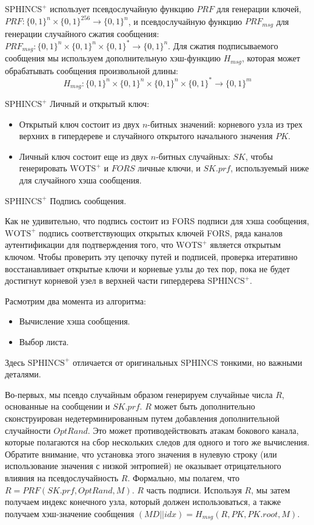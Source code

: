 \documentclass[a4paper, 14pt]{extarticle}
\begin{document}
$\text{SPHINCS}^{+}$ использует псевдослучайную функцию $PRF$ для генерации ключей, $PRF : \{0, 1\}^{n} \times \{0, 1\}^{256} \rightarrow \{0, 1\}^{n}$, и псевдослучайную функцию $PRF_{msg}$ для генерации случайного сжатия сообщения: $PRF_{msg} : \{0, 1\}^{n} \times \{0, 1\}^{n} \times \{0, 1\}^{*} \rightarrow \{0, 1\}^{n}$. Для сжатия подписываемого сообщения мы используем дополнительную хэш-функцию $H_{msg}$, которая может обрабатывать сообщения произвольной длины:
\[H_{msg} : \{0, 1\}^{n} \times \{0, 1\}^{n} \times \{0, 1\}^{n} \times \{0, 1\}^{*} \rightarrow \{0, 1\}^{m}\]

$\text{SPHINCS}^{+}$ Личный и открытый ключ:

\begin{itemize}
    \item Открытый ключ состоит из двух $n$-битных значений: корневого узла из трех верхних в гипердереве и случайного открытого начального значения $PK$.
    \item Личный ключ состоит еще из двух $n$-битных случайных: $SK$, чтобы генерировать $\text{WOTS}^{+}$ и $FORS$ личные ключи, и $SK.prf$, используемый ниже для случайного хэша сообщения.
\end{itemize}

$\text{SPHINCS}^{+}$ Подпись сообщения.

Как не удивительно, что подпись состоит из FORS подписи для хэша сообщения, $\text{WOTS}^{+}$ подпись соответствующих открытых ключей FORS, ряда каналов аутентификации для подтверждения того, что $\text{WOTS}^{+}$ является открытым ключом. Чтобы проверить эту цепочку путей и подписей, проверка итеративно восстанавливает открытые ключи и корневые узлы до тех пор, пока не будет достигнут корневой узел в верхней части гипердерева $\text{SPHINCS}^{+}$. 
\newline

Расмотрим два момента из алгоритма:

\begin{itemize}
    \item Вычисление хэша сообщения.
    \item Выбор листа.
\end{itemize}

Здесь $\text{SPHINCS}^{+}$ отличается от оригинальных SPHINCS тонкими, но важными деталями.

Во-первых, мы псевдо случайным образом генерируем случайные числа $R$, основанные на сообщении и $SK.prf$. $R$ может быть дополнительно сконструирован недетерминированным путем добавления дополнительной случайности $OptRand$. Это может противодействовать атакам бокового канала, которые полагаются на сбор нескольких следов для одного и того же вычисления. Обратите внимание, что установка этого значения в нулевую строку (или использование значения с низкой энтропией) не оказывает отрицательного влияния на псевдослучайность $R$. Формально, мы полагем, что $R = PRF(SK.prf, OptRand, M)$. $R$ часть подписи. Используя $R$, мы затем получаем индекс конечного узла, который должен использоваться, а также получаем хэш-значение сообщения $(MD||idx) = H_{msg}(R, PK, PK.root, M)$.
\end{document}
